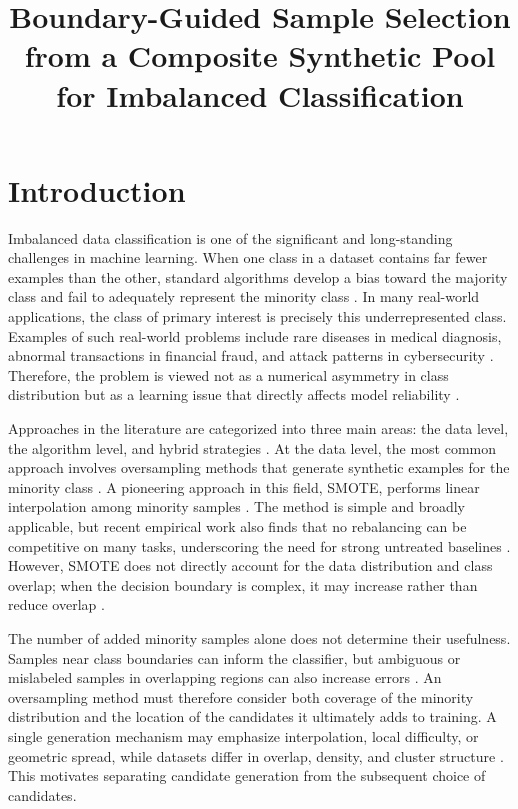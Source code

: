 \documentclass[pdflatex]{sn-jnl}
\title[Boundary-guided sample selection]{Boundary-Guided Sample Selection from a Composite Synthetic Pool for Imbalanced Classification}
\author*[1]{\fnm{Mehmet Akif} \sur{\c{S}ahman}}\email{asahman@selcuk.edu.tr}
\affil[1]{\orgdiv{Department of Electrical and Electronics Engineering}, \orgname{Faculty of Technology, Sel\c{c}uk University}, \orgaddress{\city{Konya}, \country{Turkey}}}
\begin{document}
\maketitle
\makeatletter
\let\@oddhead\@empty\let\@evenhead\@empty
\makeatother


\section{Introduction}\label{sec:1}

Imbalanced data classification is one of the significant and long-standing challenges in machine learning. When one class in a dataset contains far fewer examples than the other, standard algorithms develop a bias toward the majority class and fail to adequately represent the minority class \cite{ref01} \cite{ref02}. In many real-world applications, the class of primary interest is precisely this underrepresented class. Examples of such real-world problems include rare diseases in medical diagnosis, abnormal transactions in financial fraud, and attack patterns in cybersecurity \cite{ref03} \cite{ref04}. Therefore, the problem is viewed not as a numerical asymmetry in class distribution but as a learning issue that directly affects model reliability \cite{ref03} \cite{ref05}.

Approaches in the literature are categorized into three main areas: the data level, the algorithm level, and hybrid strategies \cite{ref01} \cite{ref02}. At the data level, the most common approach involves oversampling methods that generate synthetic examples for the minority class \cite{ref06}. A pioneering approach in this field, SMOTE, performs linear interpolation among minority samples \cite{ref07}. The method is simple and broadly applicable, but recent empirical work also finds that no rebalancing can be competitive on many tasks, underscoring the need for strong untreated baselines \cite{ref08}. However, SMOTE does not directly account for the data distribution and class overlap; when the decision boundary is complex, it may increase rather than reduce overlap \cite{ref02} \cite{ref16}.

The number of added minority samples alone does not determine their usefulness. Samples near class boundaries can inform the classifier, but ambiguous or mislabeled samples in overlapping regions can also increase errors \cite{ref10,ref13,ref16}. An oversampling method must therefore consider both coverage of the minority distribution and the location of the candidates it ultimately adds to training. A single generation mechanism may emphasize interpolation, local difficulty, or geometric spread, while datasets differ in overlap, density, and cluster structure \cite{ref15,ref17}. This motivates separating candidate generation from the subsequent choice of candidates.
\end{document}
